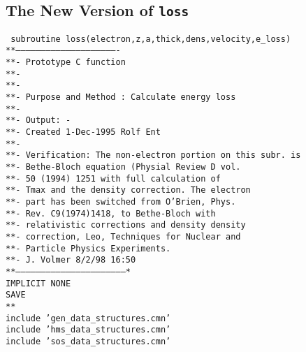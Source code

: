 \newpage

\subsection{The New Version of {\tt loss}}
\hspace*{\parindent}

{\tt
      subroutine loss(electron,z,a,thick,dens,velocity,e\_loss)\\
**-------------------------------------------------------------\\
**-         Prototype C function \\
**- \\
**-\\
**-    Purpose and Method :  Calculate energy loss \\
**-    \\
**-    Output: -\\
**-    Created   1-Dec-1995  Rolf Ent\\
**-   \\
**-    Verification:  The non-electron portion on this subr. is \\
**-		     Bethe-Bloch equation (Physial Review D vol.\\
**-		     50 (1994) 1251 with full calculation of \\
**-		     Tmax and the density correction. The electron \\
**-		     part has been switched from O'Brien, Phys. \\
**-		     Rev. C9(1974)1418, to Bethe-Bloch with \\
**-		     relativistic corrections and density density \\
**-		     correction, Leo, Techniques for Nuclear and\\
**-		     Particle Physics Experiments.\\
**-                   J. Volmer 8/2/98 16:50\\
**-----------------------------------------------------------------*\\
      IMPLICIT NONE\\
      SAVE\\
**\\
      include 'gen\_data\_structures.cmn'\\
      include 'hms\_data\_structures.cmn'\\
      include 'sos\_data\_structures.cmn'\\
}
